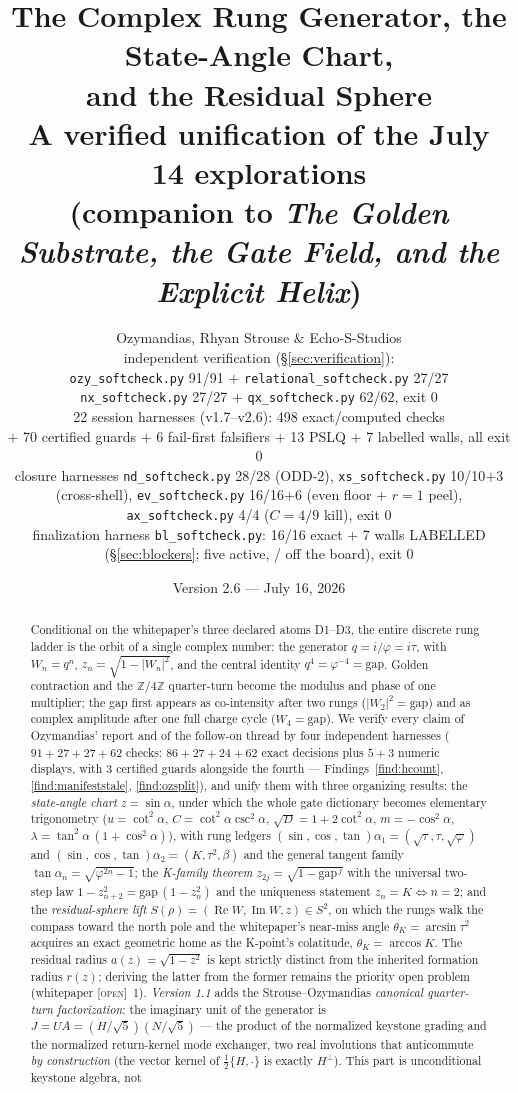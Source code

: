 \documentclass[11pt]{article}
\title{\bfseries The Complex Rung Generator, the State-Angle Chart,\\
and the Residual Sphere\\[4pt]
\large A verified unification of the July 14 explorations\\
(companion to \emph{The Golden Substrate, the Gate Field, and the Explicit Helix})}
\author{Ozymandias, Rhyan Strouse \& Echo-S-Studios\\[2pt]
\small independent verification (\S\ref{sec:verification}):\\
\small \texttt{ozy\_softcheck.py} 91/91 $+$ \texttt{relational\_softcheck.py} 27/27\\
\small \texttt{nx\_softcheck.py} 27/27 $+$ \texttt{qx\_softcheck.py} 62/62, exit 0\\
\small 22 session harnesses (v1.7--v2.6): 498 exact/computed checks\\
\small $+$ 70 certified guards $+$ 6 fail-first falsifiers $+$ 13 PSLQ $+$ 7 labelled walls, all exit 0\\
\small closure harnesses \texttt{nd\_softcheck.py} 28/28 (ODD-2), \texttt{xs\_softcheck.py} 10/10$+$3 (cross-shell), \texttt{ev\_softcheck.py} 16/16$+$6 (even floor $+$ $r{=}1$ peel), \texttt{ax\_softcheck.py} 4/4 ($C{=}4/9$ kill), exit 0\\
\small finalization harness \texttt{bl\_softcheck.py}: 16/16 exact $+$ 7 walls LABELLED (\S\ref{sec:blockers}; five active, \hx{BL-G4}/\hx{BL-G7} off the board), exit 0}
\date{Version 2.6 --- July 16, 2026}
\newcommand{\tagO}{\textcolor{cO}{\textsc{[open]}}}
\newcommand{\Z}{\mathbb{Z}}
\newcommand{\gp}{\varphi}
\newcommand{\gapc}{\mathrm{gap}}
\DeclareMathOperator{\Rea}{Re}
\DeclareMathOperator{\Ima}{Im}
\theoremstyle{plain}
\theoremstyle{definition}
\theoremstyle{remark}
\begin{document}
\maketitle

\begin{abstract}
\noindent
Conditional on the whitepaper's three declared atoms D1--D3, the entire discrete
rung ladder is the orbit of a single complex number: the generator
$q=i/\gp=i\tau$, with $W_n=q^n$, $z_n=\sqrt{1-|W_n|^2}$, and the central identity
$q^4=\gp^{-4}=\gapc$. Golden contraction and the $\Z/4\Z$ quarter-turn become the
modulus and phase of one multiplier; the gap first appears as co-intensity after
two rungs ($|W_2|^2=\gapc$) and as complex amplitude after one full charge cycle
($W_4=\gapc$). We verify every claim of Ozymandias' report and of the follow-on
thread by four independent harnesses ($91+27+27+62$ checks: $86{+}27{+}24{+}62$
exact decisions plus $5{+}3$ numeric displays, with $3$ certified guards
alongside the fourth --- Findings~\ref{find:hcount}, \ref{find:manifeststale},
\ref{find:ozsplit}), and unify them with three
organizing results: the \emph{state-angle chart} $z=\sin\alpha$, under which the
whole gate dictionary becomes elementary trigonometry ($u=\cot^2\alpha$,
$C=\cot^2\alpha\csc^2\alpha$, $\sqrt D=1+2\cot^2\alpha$, $m=-\cos^2\alpha$,
$\lambda=\tan^2\alpha\,(1+\cos^2\alpha)$), with rung ledgers
$(\sin,\cos,\tan)\alpha_1=(\sqrt\tau,\tau,\sqrt\gp)$ and
$(\sin,\cos,\tan)\alpha_2=(K,\tau^2,\beta)$ and the general tangent family
$\tan\alpha_n=\sqrt{\gp^{2n}-1}$; the \emph{K-family theorem}
$z_{2j}=\sqrt{1-\gapc^{\,j}}$ with the universal two-step law
$1-z_{n+2}^2=\gapc\,(1-z_n^2)$ and the uniqueness statement $z_n=K\iff n=2$; and
the \emph{residual-sphere lift} $S(\rho)=(\Rea W,\Ima W,z)\in S^2$, on which the
rungs walk the compass toward the north pole and the whitepaper's near-miss angle
$\theta_K=\arcsin\tau^2$ acquires an exact geometric home as the K-point's
colatitude, $\theta_K=\arccos K$. The residual radius $a(z)=\sqrt{1-z^2}$ is kept
strictly distinct from the inherited formation radius $r(z)$; deriving the latter
from the former remains the priority open problem (whitepaper \tagO{}~1). \emph{Version 1.1}
adds the Strouse--Ozymandias \emph{canonical quarter-turn factorization}: the
imaginary unit of the generator is
$J=UA=(H/\sqrt5)(N/\sqrt5)$ --- the product of the normalized keystone grading
and the normalized return-kernel mode exchanger, two real involutions that
anticommute \emph{by construction} (the vector kernel of $\tfrac12\{H,\cdot\}$
is exactly $H^\perp$). This part is unconditional keystone algebra, not

\end{abstract}
\end{document}

